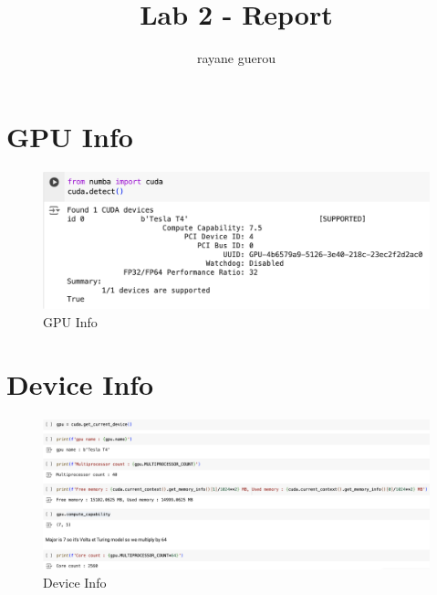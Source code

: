 \documentclass{article}
\title{Lab 2 - Report}
\author{rayane guerou}
\begin{document}
\maketitle

\section{GPU Info}

\begin{figure}[h]
\centering
\includegraphics[scale=0.5]{src/gpus.png}
\caption{GPU Info}
\end{figure}

\section{Device Info}

\begin{figure}[h]
\centering
\includegraphics[scale=0.3]{src/gpu-infos.png}
\caption{Device Info}
\end{figure}
\end{document}
